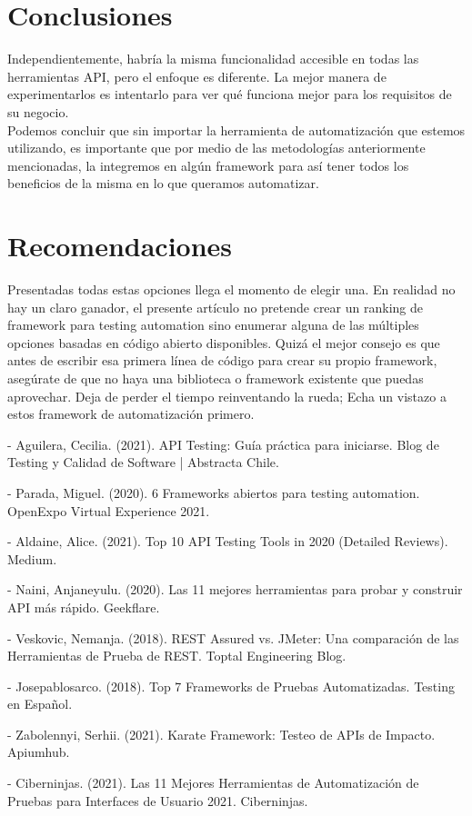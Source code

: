 \documentclass[twoside,twocolumn]{article}
\begin{document}
\section{Conclusiones}
Independientemente, habría la misma funcionalidad accesible en todas las herramientas API, pero el enfoque es diferente. La mejor manera de experimentarlos es intentarlo para ver qué funciona mejor para los requisitos de su negocio.\\
Podemos concluir que sin importar la herramienta de automatización que estemos utilizando, es importante que por medio de las metodologías anteriormente mencionadas, la integremos en algún framework para así tener todos los beneficios de la misma en lo que queramos automatizar.
\section{Recomendaciones}
Presentadas todas estas opciones llega el momento de elegir una. En realidad no hay un claro ganador, el presente artículo no pretende crear un ranking de framework para testing automation sino enumerar alguna de las múltiples opciones basadas en código abierto disponibles. 
Quizá el mejor consejo es que antes de escribir esa primera línea de código para crear su propio framework, asegúrate de que no haya una biblioteca o framework existente que puedas aprovechar. Deja de perder el tiempo reinventando la rueda; Echa un vistazo a estos framework de automatización primero.


\begin{thebibliography}{99}
	\bibitem - Aguilera, Cecilia. (2021). API Testing: Guía práctica para iniciarse. Blog de Testing y Calidad de Software | Abstracta Chile.

    \bibitem - Parada, Miguel. (2020). 6 Frameworks abiertos para testing automation. OpenExpo Virtual Experience 2021.

    \bibitem - Aldaine, Alice. (2021). Top 10 API Testing Tools in 2020 (Detailed Reviews). Medium.

    \bibitem - Naini, Anjaneyulu. (2020). Las 11 mejores herramientas para probar y construir API más rápido. Geekflare.

    \bibitem - Veskovic, Nemanja. (2018). REST Assured vs. JMeter: Una comparación de las Herramientas de Prueba de REST. Toptal Engineering Blog.

    \bibitem - Josepablosarco. (2018). Top 7 Frameworks de Pruebas Automatizadas. Testing en Español.

    \bibitem - Zabolennyi, Serhii. (2021). Karate Framework: Testeo de APIs de Impacto. Apiumhub.

    \bibitem - Ciberninjas. (2021). Las 11 Mejores Herramientas de Automatización de Pruebas para Interfaces de Usuario 2021. Ciberninjas.
	\end{thebibliography}

\end{document}
